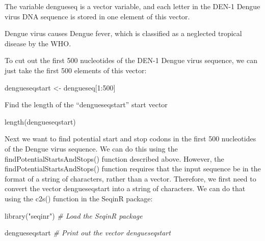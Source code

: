 \documentclass[
]{book}
\newenvironment{Shaded}{\begin{snugshade}}{\end{snugshade}}
\newcommand{\CommentTok}[1]{\textcolor[rgb]{0.56,0.35,0.01}{\textit{#1}}}
\newcommand{\DecValTok}[1]{\textcolor[rgb]{0.00,0.00,0.81}{#1}}
\newcommand{\FunctionTok}[1]{\textcolor[rgb]{0.00,0.00,0.00}{#1}}
\newcommand{\NormalTok}[1]{#1}
\newcommand{\OtherTok}[1]{\textcolor[rgb]{0.56,0.35,0.01}{#1}}
\newcommand{\SpecialCharTok}[1]{\textcolor[rgb]{0.00,0.00,0.00}{#1}}
\newcommand{\StringTok}[1]{\textcolor[rgb]{0.31,0.60,0.02}{#1}}
\begin{document}
The variable dengueseq is a vector variable, and each letter in the DEN-1 Dengue virus DNA sequence is stored in one element of this vector.

Dengue virus causes Dengue fever, which is classified as a neglected tropical disease by the WHO.

To cut out the first 500 nucleotides of the DEN-1 Dengue virus sequence, we can just take the first 500 elements of this vector:

\begin{Shaded}
\begin{Highlighting}[]
\NormalTok{dengueseqstart }\OtherTok{\textless{}{-}}\NormalTok{ dengueseq[}\DecValTok{1}\SpecialCharTok{:}\DecValTok{500}\NormalTok{] }
\end{Highlighting}
\end{Shaded}

Find the length of the ``dengueseqstart'' start vector

\begin{Shaded}
\begin{Highlighting}[]
\FunctionTok{length}\NormalTok{(dengueseqstart)             }
\end{Highlighting}
\end{Shaded}

Next we want to find potential start and stop codons in the first 500 nucleotides of the Dengue virus sequence. We can do this using the findPotentialStartsAndStops() function described above. However, the findPotentialStartsAndStops() function requires that the input sequence be in the format of a string of characters, rather than a vector. Therefore, we first need to convert the vector dengueseqstart into a string of characters. We can do that using the c2s() function in the SeqinR package:

\begin{Shaded}
\begin{Highlighting}[]
\FunctionTok{library}\NormalTok{(}\StringTok{"seqinr"}\NormalTok{)                 }\CommentTok{\# Load the SeqinR package}
\end{Highlighting}
\end{Shaded}

\begin{Shaded}
\begin{Highlighting}[]
\NormalTok{dengueseqstart                    }\CommentTok{\# Print out the vector dengueseqstart}
\end{Highlighting}
\end{Shaded}
\end{document}
